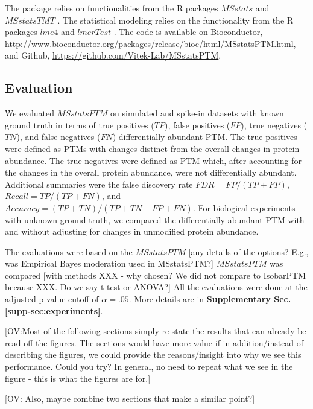 \documentclass[mcp]{article}
\numberwithin{table}{section}
\def\todo#1{{\color{red}[#1]}}
\begin{document}
The package relies on functionalities from the R packages $MSstats$ \cite{Choi:2014} and $MSstatsTMT$ \cite{Huang:2020}. The statistical modeling relies on the functionality from the R packages $lme4$ \cite{Bates2015} and $lmerTest$ \cite{Kuznetsova2017}. The code is available on Bioconductor, \url{http://www.bioconductor.org/packages/release/bioc/html/MSstatsPTM.html}, and Github, \url{https://github.com/Vitek-Lab/MSstatsPTM}.

\subsection*{Evaluation}

We evaluated $MSstatsPTM$ on simulated and spike-in datasets with known ground truth in terms of true positives ($TP$), false positives ($FP$), true negatives ($TN$), and false negatives ($FN$) differentially abundant PTM. The true positives were defined as PTMs with changes distinct from the overall changes in protein abundance. The true negatives were defined as PTM which, after accounting for the changes in the overall protein abundance, were not differentially abundant. Additional summaries were the false discovery rate $FDR=FP/(TP+FP)$, $Recall=TP/(TP + FN)$, and $Accuracy=(TP + TN) / (TP + TN + FP + FN)$.
For biological experiments with unknown ground truth, we compared the differentially abundant PTM  with and without adjusting for changes in unmodified protein abundance. 

The evaluations were based on the $MSstatsPTM$ \todo{any details of the options? E.g., was Empirical Bayes moderation used in MSstatsPTM?} $MSstatsPTM$ was compared \todo{with methods XXX - why chosen? We did not compare to IsobarPTM because XXX. Do we say t-test or ANOVA?} All the evaluations were done at the adjusted p-value cutoff of $\alpha=.05$. More details are in {\bf Supplementary Sec. \ref{supp-sec:experiments}}. 

\todo{OV:Most of the following sections simply re-state the results that can already be read off the figures. The sections would have more value if in addition/instead of describing the figures, we could provide the reasons/insight into why we see this performance. Could you try? In general, no need to repeat what we see in the figure - this is what the figures are for.}

\todo{OV: Also, maybe combine two sections that make a similar point?}
\end{document}
